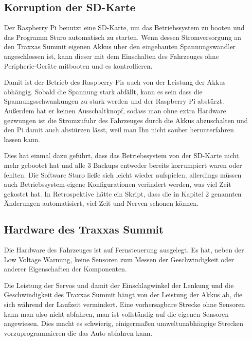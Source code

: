 \documentclass[a4paper,10pt]{scrartcl}
\begin{document}
  \subsection{Korruption der SD-Karte}

    Der Raspberry Pi benutzt eine SD-Karte, um das Betriebssystem zu booten und
    das Programm Sturo automatisch zu starten.
    Wenn dessen Stromversorgung an den Traxxas Summit eigenen Akkus über den
    eingebauten Spannungswandler angeschlossen ist, kann dieser mit dem
    Einschalten des Fahrzeuges ohne Peripherie-Geräte mitbooten und es
    kontrollieren.

    Damit ist der Betrieb des Raspberry Pis auch von der Leistung der Akkus
    abhängig.
    Sobald die Spannung stark abfällt, kann es sein dass die
    Spannungsschwankungen zu stark werden und der Raspberry Pi abstürzt.
    Außerdem hat er keinen Ausschaltknopf, sodass man ohne extra Hardware
    gezwungen ist die Stromzufuhr des Fahrzeuges durch die Akkus abzuschalten
    und den Pi damit auch abstürzen lässt, weil man Ihn nicht sauber
    herunterfahren lassen kann.

    Dies hat einmal dazu geführt, dass das Betriebssystem von der SD-Karte nicht
    mehr gebootet hat und alle 3 Backups entweder bereits korrumpiert waren
    oder fehlten.
    Die Software Sturo ließe sich leicht wieder aufspielen, allerdings müssen
    auch Betriebssystem-eigene Konfigurationen verändert werden, was viel Zeit
    gekostet hat.
    In Retrospektive hätte ein Skript, dass die in Kapitel 2 genannten
    Änderungen automatisiert, viel Zeit und Nerven schonen können.

  \subsection{Hardware des Traxxas Summit}

    Die Hardware des Fahrzeuges ist auf Fernsteuerung ausgelegt.
    Es hat, neben der Low Voltage Warnung, keine Sensoren zum Messen der
    Geschwindigkeit oder anderer Eigenschaften der Komponenten.

    Die Leistung der Servos und damit der Einschlagwinkel der Lenkung und die
    Geschwindigkeit des Traxxas Summit hängt von der Leistung der Akkus ab,
    die sich während der Laufzeit vermindert.
    Eine vorhersagbare Strecke ohne Sensoren kann man also nicht abfahren, man
    ist vollständig auf die eigenen Sensoren angewiesen.
    Dies macht es schwierig, einigermaßen umweltunabhängige Strecken
    vorzuprogrammieren die das Auto abfahren kann.
\end{document}
